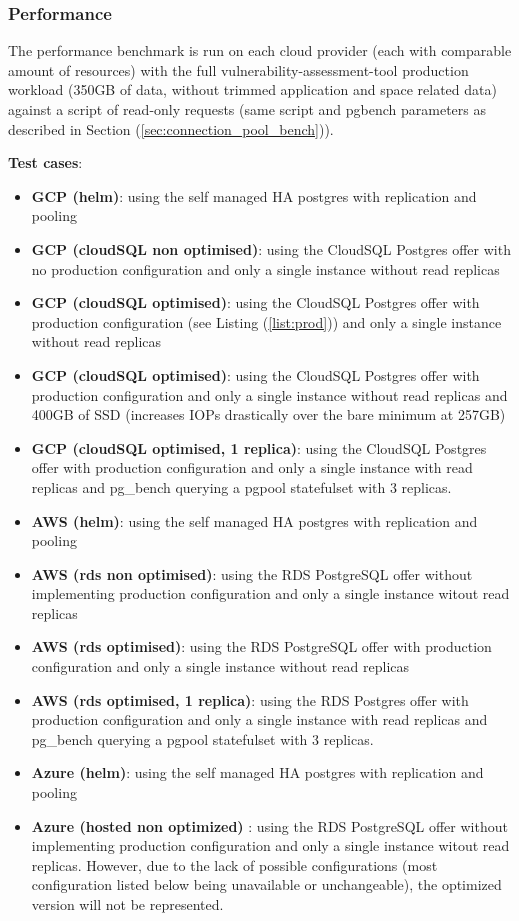 \documentclass[11pt]{article}
\begin{document}
\subsubsection{Performance}

\hspace{5mm} The performance benchmark is run on each cloud provider (each with comparable amount of resources) with the full vulnerability-assessment-tool production workload (350GB of data, without trimmed application and space related data) against a script of read-only requests (same script and pgbench parameters as described in Section (\ref{sec:connection_pool_bench})).

\textbf{Test cases}:
\begin{itemize}
    \item \textbf{GCP (helm)}: using the self managed HA postgres with replication and pooling
    \item \textbf{GCP (cloudSQL non optimised)}: using the CloudSQL Postgres offer with no production configuration and only a single instance without read replicas
    \item \textbf{GCP (cloudSQL optimised)}: using the CloudSQL Postgres offer with production configuration (see Listing (\ref{list:prod})) and only a single instance without read replicas
    \item \textbf{GCP (cloudSQL optimised)}: using the CloudSQL Postgres offer with production configuration and only a single instance without read replicas and 400GB of SSD (increases IOPs drastically over the bare minimum at 257GB)
    \item \textbf{GCP (cloudSQL optimised, 1 replica)}: using the CloudSQL Postgres offer with production configuration and only a single instance with read replicas and pg\_bench querying a pgpool statefulset with 3 replicas.
    \item \textbf{AWS (helm)}: using the self managed HA postgres with replication and pooling
    \item \textbf{AWS (rds non optimised)}: using the RDS PostgreSQL offer without implementing production configuration and only a single instance witout read replicas
    \item \textbf{AWS (rds optimised)}: using the RDS PostgreSQL offer with production configuration and only a single instance without read replicas
    \item \textbf{AWS (rds optimised, 1 replica)}: using the RDS Postgres offer with production configuration and only a single instance with read replicas and pg\_bench querying a pgpool statefulset with 3 replicas.
    \item \textbf{Azure (helm)}: using the self managed HA postgres with replication and pooling
    \item \textbf{Azure (hosted non optimized)} : using the RDS PostgreSQL offer without implementing production configuration and only a single instance witout read replicas. However, due to the lack of possible configurations (most configuration listed below being unavailable or unchangeable), the optimized version will not be represented.
\end{itemize}
\end{document}
